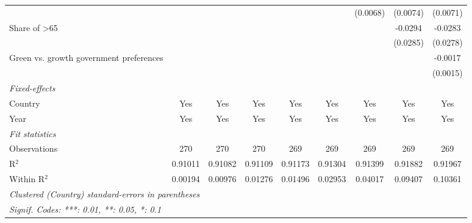 \begin{table}[htbp]
\begin{tabular}{lcccccccc}
                                                    &          &          &          &          &          & (0.0068) & (0.0074) & (0.0071)\\   
      Share of >65                                  &          &          &          &          &          &          & -0.0294  & -0.0283\\   
                                                    &          &          &          &          &          &          & (0.0285) & (0.0278)\\   
      Green vs. growth government preferences       &          &          &          &          &          &          &          & -0.0017\\   
                                                    &          &          &          &          &          &          &          & (0.0015)\\   
      \midrule
      \emph{Fixed-effects}\\
      Country                                       & Yes      & Yes      & Yes      & Yes      & Yes      & Yes      & Yes      & Yes\\  
      Year                                          & Yes      & Yes      & Yes      & Yes      & Yes      & Yes      & Yes      & Yes\\  
      \midrule
      \emph{Fit statistics}\\
      Observations                                  & 270      & 270      & 270      & 269      & 269      & 269      & 269      & 269\\  
      R$^2$                                         & 0.91011  & 0.91082  & 0.91109  & 0.91173  & 0.91304  & 0.91399  & 0.91882  & 0.91967\\  
      Within R$^2$                                  & 0.00194  & 0.00976  & 0.01276  & 0.01496  & 0.02953  & 0.04017  & 0.09407  & 0.10361\\  
      \midrule \midrule
      \multicolumn{9}{l}{\emph{Clustered (Country) standard-errors in parentheses}}\\
      \multicolumn{9}{l}{\emph{Signif. Codes: ***: 0.01, **: 0.05, *: 0.1}}\\
   \end{tabular}
\end{table}


